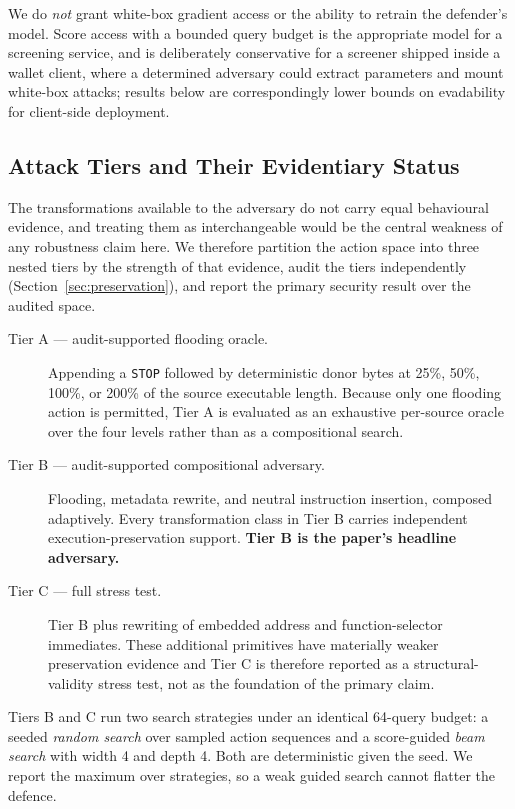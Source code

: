 \documentclass[conference]{IEEEtran}
\newcommand{\code}[1]{\texttt{#1}}
\begin{document}
We do \emph{not} grant white-box gradient access or the ability to retrain the defender's model. Score access with a bounded query budget is the appropriate model for a screening service, and is deliberately conservative for a screener shipped inside a wallet client, where a determined adversary could extract parameters and mount white-box attacks; results below are correspondingly lower bounds on evadability for client-side deployment.

\subsection{Attack Tiers and Their Evidentiary Status}
\label{sec:tiers}

The transformations available to the adversary do not carry equal behavioural evidence, and treating them as interchangeable would be the central weakness of any robustness claim here. We therefore partition the action space into three nested tiers by the strength of that evidence, audit the tiers independently (Section~\ref{sec:preservation}), and report the primary security result over the audited space.

\begin{description}
\item[Tier A --- audit-supported flooding oracle.] Appending a \code{STOP} followed by deterministic donor bytes at 25\%, 50\%, 100\%, or 200\% of the source executable length. Because only one flooding action is permitted, Tier A is evaluated as an exhaustive per-source oracle over the four levels rather than as a compositional search.
\item[Tier B --- audit-supported compositional adversary.] Flooding, metadata rewrite, and neutral instruction insertion, composed adaptively. Every transformation class in Tier B carries independent execution-preservation support. \textbf{Tier B is the paper's headline adversary.}
\item[Tier C --- full stress test.] Tier B plus rewriting of embedded address and function-selector immediates. These additional primitives have materially weaker preservation evidence and Tier C is therefore reported as a structural-validity stress test, not as the foundation of the primary claim.
\end{description}

Tiers B and C run two search strategies under an identical 64-query budget: a seeded \emph{random search} over sampled action sequences and a score-guided \emph{beam search} with width 4 and depth 4. Both are deterministic given the seed. We report the maximum over strategies, so a weak guided search cannot flatter the defence.
\end{document}
